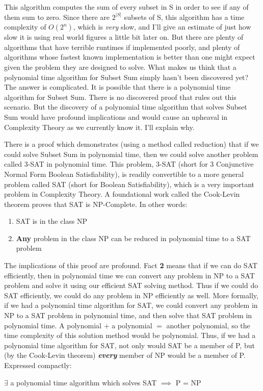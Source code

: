 \documentclass[12pt,twoside]{reedthesis}
\begin{document}
This algorithm computes the sum of every subset in S in order to see if any of them sum to zero. Since there are $2^{|S|}$ subsets of S, this algorithm has a time complexity of $O(2^n)$, which is \textit{very} slow, and I'll give an estimate of just how slow it is using real world figures a little bit later on. But there are plenty of algorithms that have terrible runtimes if implemented poorly, and plenty of algorithms whose fastest known implementation is better than one might expect given the problem they are designed to solve. What makes us think that a polynomial time algorithm for Subset Sum simply hasn't been discovered yet? The answer is complicated. It is possible that there is a polynomial time algorithm for Subset Sum. There is no discovered proof that rules out this scenario. But the discovery of a polynomial time algorithm that solves Subset Sum would have profound implications and would cause an upheaval in Complexity Theory as we currently know it. I'll explain why. \par
	There is a proof  which demonstrates (using a method called reduction) that if we could solve Subset Sum in polynomial time, then we could solve another problem called 3-SAT in polynomial time. This problem, 3-SAT (short for 3 Conjunctive Normal Form Boolean Satisfiability), is readily convertible to a more general problem called SAT (short for Boolean Satisfiability), which is a very important problem in Complexity Theory. A foundational work called the Cook-Levin theorem  proves that SAT is NP-Complete. In other words:
\begin{enumerate}
\item SAT is in the class NP
\item \textbf{Any} problem in the class NP can be reduced in polynomial time to a SAT problem
\end{enumerate}
The implications of this proof are profound. Fact \textbf{2} means that if we can do SAT efficiently, then in polynomial time we can convert any problem in NP to a SAT problem and solve it using our efficient SAT solving method. Thus if we could do SAT efficiently, we could do any problem in NP efficiently as well. More formally, if we had a polynomial time algorithm for SAT, we could convert any problem in NP to a SAT problem in polynomial time, and then solve that SAT problem in polynomial time. A polynomial $+$ a polynomial $=$ another polynomial, so the time complexity of this solution method would be polynomial. Thus, if we had a polynomial time algorithm for SAT, not only would SAT be a member of P, but (by the Cook-Levin theorem) \textbf{\textit{every}} member of NP would be a member of P. Expressed compactly:
\begin{center}
$\exists$ a polynomial time algorithm which solves SAT $\implies$ P = NP
\end{center}
\end{document}
